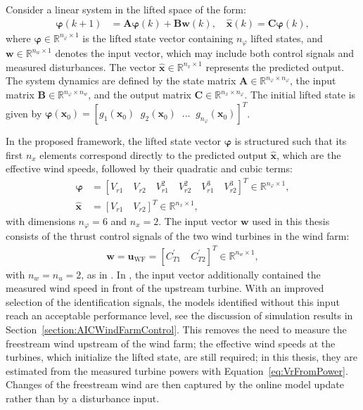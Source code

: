 Consider a linear system in the lifted space of the form:
\begin{align}
    \bm{\varphi}(k+1) &= \bm{A} \bm{\varphi}(k) + \bm{B} \bm{w}(k), 
    \quad \hat{\bm{x}}(k) = \bm{C} \bm{\varphi}(k), 
    \label{eq:linearPredictor}
\end{align}
where $\bm{\varphi} \in \mathbb{R}^{n_\varphi \times 1}$ is the lifted state vector containing $n_\varphi$ lifted states, and $\bm{w} \in \mathbb{R}^{n_w \times 1}$ denotes the input vector, which may include both control signals and measured disturbances. The vector $\hat{\bm{x}} \in \mathbb{R}^{n_x \times 1}$ represents the predicted output. The system dynamics are defined by the state matrix $\bm{A} \in \mathbb{R}^{n_\varphi \times n_\varphi}$, the input matrix $\bm{B} \in \mathbb{R}^{n_\varphi \times n_w}$, and the output matrix $\bm{C} \in \mathbb{R}^{n_x \times n_\varphi}$. The initial lifted state is given by $\bm{\varphi}(\bm{x}_0) = [g_{1}(\bm{x}_0)\;\; g_{2}(\bm{x}_0) \;\; \ldots\;\;g_{n_\varphi}(\bm{x}_0)]^T$.

In the proposed framework, the lifted state vector $\bm{\varphi}$ is structured such that its first $n_x$ elements correspond directly to the predicted output $\hat{\bm{x}}$, which are the effective wind speeds, followed by their quadratic and cubic terms:
\begin{align*}
    \bm{\varphi} &= [V_{r1} \quad V_{r2} \quad V^2_{r1} \quad V^2_{r2} \quad  V^3_{r1} \quad V^3_{r2}]^T   \in \mathbb{R}^{n_\varphi \times 1}, \\
    \hat{\bm{x}} &=  [V_{r1} \quad V_{r2}] ^T   \in \mathbb{R}^{n_x \times 1},
\end{align*}
with dimensions $n_\varphi = 6$ and $n_x = 2$. The input vector $\bm{w}$ used in this thesis consists of the thrust control signals of the two wind turbines in the wind farm:
\begin{align} \label{eq:wOnlyCt}
    \bm{w} = \bm{u}_{\text{WF}} = [C^{\prime}_{T1} \quad C^{\prime}_{T2}]^T \in \mathbb{R}^{n_w \times 1},
\end{align}
with $n_w = n_u = 2$, as in \cite{sharan2022Koopman}. In \cite{dittmer2022data}, the input vector additionally contained the measured wind speed in front of the upstream turbine. With an improved selection of the identification signals, the models identified without this input reach an acceptable performance level, see the discussion of simulation results in Section~\ref{section:AICWindFarmControl}. This removes the need to measure the freestream wind upstream of the wind farm; the effective wind speeds at the turbines, which initialize the lifted state, are still required; in this thesis, they are estimated from the measured turbine powers with Equation~\eqref{eq:VrFromPower}. Changes of the freestream wind are then captured by the online model update rather than by a disturbance input.

